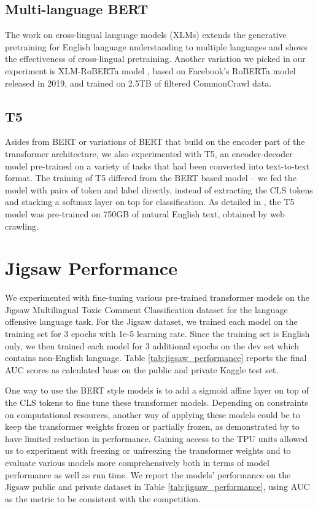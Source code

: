 \documentclass[11pt,a4paper]{article}
\begin{document}
\subsection{Multi-language BERT}
The work on cross-lingual language models (XLMs) \citep{DBLP:journals/corr/abs-1901-07291} extends the generative pretraining for English language understanding to multiple languages and shows the effectiveness of cross-lingual pretraining. Another variation we picked in our experiment is XLM-RoBERTa model \citep{conneau2019unsupervised}, based on Facebook’s RoBERTa model released in 2019, and trained on 2.5TB of filtered CommonCrawl data. 

\subsection{T5}
Asides from BERT or variations of BERT that build on the encoder part of the transformer architecture, we also experimented with T5, an encoder-decoder model pre-trained on a variety of tasks that had been converted into text-to-text format. The training of T5 differed from the BERT based model -- we fed the model with pairs of token and label directly, instead of extracting the CLS tokens and stacking a softmax layer on top for classification. As detailed in \citep{raffel2019exploring}, the T5 model was pre-trained on 750GB of natural English text, obtained by web crawling.


\section{Jigsaw Performance}
We experimented with fine-tuning various pre-trained transformer models on the Jigsaw Multilingual Toxic Comment Classification dataset for the language offensive language task. For the Jigsaw dataset, we trained each model on the training set for 3 epochs with 1e-5 learning rate. Since the training set is English only, we then trained each model for 3 additional epochs on the dev set which contains non-English language. Table \ref{tab:jigsaw_performance} reports the final AUC scores as calculated base on the public and private Kaggle test set.

One way to use the BERT style models is to add a sigmoid affine layer on top of the CLS tokens to fine tune these transformer models. Depending on constraints on computational resources, another way of applying these models could be to keep the transformer weights frozen or partially frozen, as demonstrated by \citep{lee2019elsa} to have limited reduction in performance. Gaining access to the TPU units allowed us to experiment with freezing or unfreezing the transformer weights and to evaluate various models more comprehensively both in terms of model performance as well as run time. %
We report the models' performance on the Jigsaw public and private dataset in Table \ref{tab:jigsaw_performance}, using AUC as the metric to be consistent with the competition. 
\end{document}
